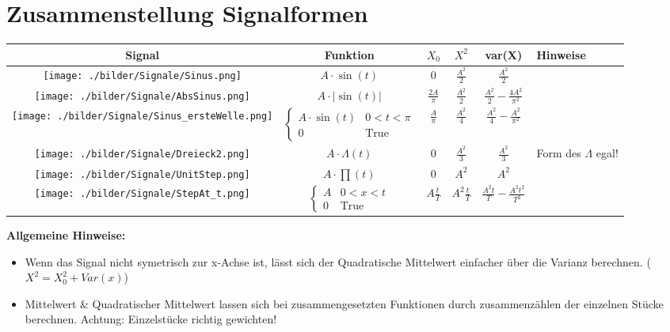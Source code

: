 \section{Zusammenstellung Signalformen}
\begin{table}[htdp]
\begin{center}
\begin{tabular}{|c|c|c|c|c|p{6cm}|}
\hline
\textbf{Signal} & \textbf{Funktion} & \textbf{$X_0$} & \textbf{$X^2$} & \textbf{var(X)} & \textbf{Hinweise} \\

\hline
\parbox[c][2.1cm]{3.5cm}{\texttt{[image: ./bilder/Signale/Sinus.png]}} &
$A\cdot\sin(t)$  & $0$ &
$\frac{A^2}{2}$ & $\frac{A^2}{2}$
&  \\

\hline
\parbox[c][2.1cm]{3.5cm}{\texttt{[image: ./bilder/Signale/AbsSinus.png]}} &
$A\cdot|\sin(t)|$  &
$\frac{2A}{\pi}$ & $\frac{A^2}{2}$ & $\frac{A^2}{2}-\frac{4A^2}{\pi^2}$
& \\

\hline
\parbox[c][2.1cm]{3.5cm}{\texttt{[image: ./bilder/Signale/Sinus\_ersteWelle.png]}} &
$\begin{cases} A\cdot\sin (t) & 0<t<\pi  \\ 0 & \text{True}\end{cases}$ & $\frac{A}{\pi}$ &
$\frac{A^2}{4}$ & $\frac{A^2}{4}-\frac{A^2}{\pi^2}$
& \\

\hline
\parbox[c][2.1cm]{3.5cm}{\texttt{[image: ./bilder/Signale/Dreieck2.png]}} &
$A\cdot\Lambda(t)$
& $0$ & $\frac{A^2}{3}$ &
$\frac{A^2}{3}$
& Form des $\Lambda$ egal! \\

\hline
\parbox[c][2.1cm]{3.5cm}{\texttt{[image: ./bilder/Signale/UnitStep.png]}} &
$A\cdot\prod(t)$
& $0$ & $A^2$ & $A^2$
& \\

\hline
\parbox[c][2.1cm]{3.5cm}{\texttt{[image: ./bilder/Signale/StepAt\_t.png]}} &
$\begin{cases} A & 0<x<t \\ 0 & \text{True}\end{cases}$ 
& $A\frac{t}{T}$ &
$A^2\frac{t}{T}$ & $\frac{A^2t}{T}-\frac{A^2t^2}{T^2}$
& \\

\hline
\end{tabular}
\end{center}
\end{table}

\textbf{Allgemeine Hinweise:}
\begin{itemize}
  \item Wenn das Signal nicht symetrisch zur x-Achse ist, lässt sich der Quadratische Mittelwert einfacher über die
  Varianz berechnen. ($X^2 = X_0^2 + Var(x)$)
  \item Mittelwert \& Quadratischer Mittelwert lassen sich bei zusammengesetzten Funktionen durch zusammenzählen der
  einzelnen Stücke berechnen. Achtung: Einzelstücke richtig gewichten!
\end{itemize}
